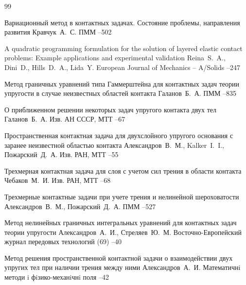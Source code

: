 \begin{thebibliography}{99}

\paper Вариационный метод в контактных задачах. Состояние проблемы, направления развития
\by Кравчук~А.~С.
\jour ПММ
--502

\paper A quadratic programming formulation for the solution of layered elastic contact problems: Example applications and experimental validation
\by    Reina~S.~A., Dini~D.,  Hills~D.~A., Lida~Y.
\jour European Journal of Mechanics -- A/Solids
--247

\paper Метод граничных уравнений типа Гаммерштейна для контактных задач теории упругости в случае неизвестных областей контакта
\by Галанов~Б.~А.
\jour ПММ
--835

	
\paper О приближенном решении некоторых задач упругого контакта двух тел
\by Галанов~Б.~А.
\jour Изв. АН СССР, МТТ
--67

\paper Пространственная  контактная  задача  для  двухслойного  упругого основания с заранее неизвестной областью контакта
\by    Александров~В.~М., Kalker~I.~I., Пожарский~Д.~А.
\jour Изв. РАН, МТТ
--55

\paper Трехмерная контактная задача для слоя с учетом сил трения в области контакта
\by    Чебаков~М.~И.
\jour Изв. РАН, МТТ
--68

\paper Трехмерные контактные задачи при учете трения и нелинейной шероховатости
\by    Александров~В.~М., Пожарский~Д.~А.
\jour ПММ
--527

\paper Метод нелинейных граничных интегральных уравнений для контактных задач теории упругости
\by    Александров~А.~И., Стреляев~Ю.~М.
\jour Восточно-Европейский журнал передовых технологий
(69)
--40

\paper Метод решения пространственной контактной задачи о взаимодействии двух упругих тел при наличии трения между ними
\by    Александров~А.~И.
\jour Математичнi методи i фiзико-механiчнi поля
--42


\end{thebibliography}
